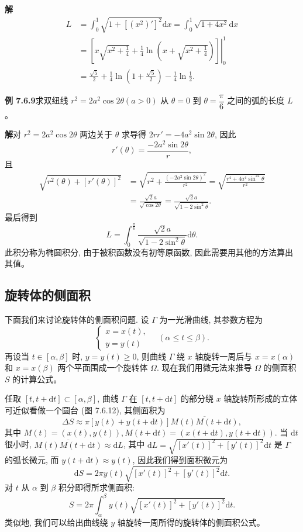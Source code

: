 \documentclass[UTF8,12pt,a4paper,fontset=fandol]{ctexart}
\begin{document}
\noindent\textbf{解}\quad
\[
\begin{aligned}
  L&=\int_0^1\sqrt{1+[(x^2)']^2}\mathrm dx
  =\int_0^1\sqrt{1+4x^2}\mathrm dx\\
  &=\left.\left[x\sqrt{x^2+\frac{1}{4}}
  +\frac{1}{4}\ln\left(x+\sqrt{x^2+\frac{1}{4}}\right)\right]\right|_0^1\\
  &=\frac{\sqrt5}{2}+\frac{1}{4}\ln\left(1+\frac{\sqrt5}{2}\right)-\frac{1}{4}\ln\frac{1}{2}.
\end{aligned}
\]

\noindent\textbf{例 7.6.9}\quad 求双纽线 $r^2=2a^2\cos2\theta(a>0)$ 从 $\theta=0$ 到 $\theta=\dfrac{\pi}{6}$ 之间的弧的长度 $L$。

\noindent\textbf{解}\quad 对 $r^2=2a^2\cos2\theta$ 两边关于 $\theta$ 求导得 $2rr'=-4a^2\sin2\theta$, 因此
\[
  r'(\theta)=\frac{-2a^2\sin2\theta}{r},
\]
且
\[
\begin{aligned}
  \sqrt{r^2(\theta)+[r'(\theta)]^2}
  &=\sqrt{r^2+\frac{(-2a^2\sin2\theta)^2}{r^2}}
  =\sqrt{\frac{r^4+4a^4\sin^22\theta}{r^2}}\\
  &=\frac{\sqrt2a}{\sqrt{\cos2\theta}}
  =\frac{\sqrt2a}{\sqrt{1-2\sin^2\theta}}.
\end{aligned}
\]
最后得到
\[
  L=\int_0^{\frac{\pi}{6}}\frac{\sqrt2a}{\sqrt{1-2\sin^2\theta}}\mathrm d\theta.
\]
此积分称为椭圆积分, 由于被积函数没有初等原函数, 因此需要用其他的方法算出其值。

\subsection{旋转体的侧面积}

下面我们来讨论旋转体的侧面积问题. 设 $\Gamma$ 为一光滑曲线, 其参数方程为
\[
  \begin{cases}
    x=x(t),\\
    y=y(t)
  \end{cases}
  \quad(\alpha\leq t\leq\beta).
\]
再设当 $t\in[\alpha,\beta]$ 时, $y=y(t)\geq0$, 则曲线 $\Gamma$ 绕 $x$ 轴旋转一周后与 $x=x(\alpha)$ 和 $x=x(\beta)$ 两个平面围成一个旋转体 $\Omega$. 现在我们用微元法来推导 $\Omega$ 的侧面积 $S$ 的计算公式。

任取 $[t,t+\mathrm dt]\subset[\alpha,\beta]$, 曲线 $\Gamma$ 在 $[t,t+\mathrm dt]$ 的部分绕 $x$ 轴旋转所形成的立体可近似看做一个圆台 (图 7.6.12), 其侧面积为
\[
  \Delta S\approx\pi[y(t)+y(t+\mathrm dt)]\overline{M(t)M(t+\mathrm dt)},
\]
其中 $M(t)=(x(t),y(t)),M(t+\mathrm dt)=(x(t+\mathrm dt),y(t+\mathrm dt))$. 当 $\mathrm dt$ 很小时, $\overline{M(t)M(t+\mathrm dt)}\approx\mathrm dL$, 其中 $\mathrm dL=\sqrt{[x'(t)]^2+[y'(t)]^2}\mathrm dt$ 是 $\Gamma$ 的弧长微元, 而 $y(t+\mathrm dt)\approx y(t)$, 因此我们得到面积微元为
\[
  \mathrm dS=2\pi y(t)\sqrt{[x'(t)]^2+[y'(t)]^2}\mathrm dt.
\]
对 $t$ 从 $\alpha$ 到 $\beta$ 积分即得所求侧面积:
\[
  S=2\pi\int_\alpha^\beta y(t)\sqrt{[x'(t)]^2+[y'(t)]^2}\mathrm dt.
\]
类似地, 我们可以给出曲线绕 $y$ 轴旋转一周所得的旋转体的侧面积公式。
\end{document}
